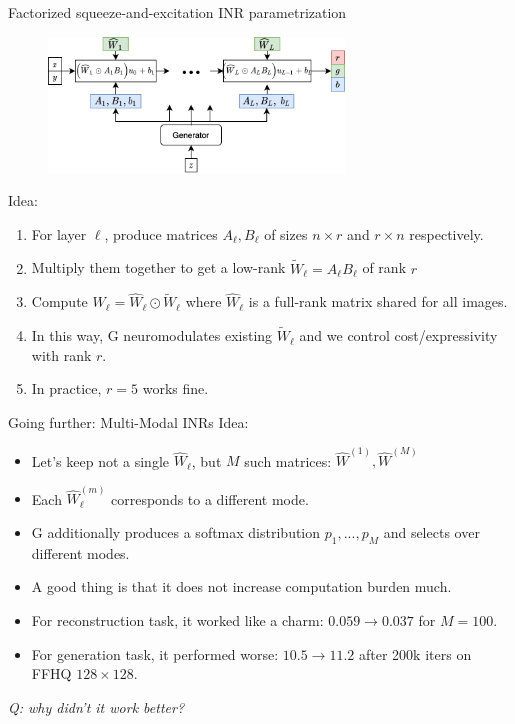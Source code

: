 \documentclass[10pt]{beamer}
\begin{document}
\begin{frame}{Factorized squeeze-and-excitation INR parametrization}
\begin{figure}
\centering
\includegraphics[width=0.7\textwidth]{images/factorized-se-linear}
\end{figure}

Idea:
\begin{enumerate}
    \item\pause For layer $\ell$, produce matrices $A_\ell, B_\ell$ of sizes $n\times r$ and $r \times n$ respectively.
    \item\pause Multiply them together to get a low-rank $\tilde{W}_\ell = A_\ell B_\ell$ of rank $r$
    \item\pause Compute $W_\ell = \hat{W}_\ell \odot \tilde{W}_\ell$ where $\hat{W}_\ell$ is a full-rank matrix shared for all images.
    \item\pause In this way, G neuromodulates existing $\tilde{W}_\ell$ and we control cost/expressivity with rank $r$.
    \item\pause In practice, $r=5$ works fine.
\end{enumerate}
\end{frame}


\begin{frame}{Going further: Multi-Modal INRs}
Idea:
\begin{itemize}
    \item\pause Let's keep not a single $\hat{W}_\ell$, but $M$ such matrices: $\hat{W}^{(1)}, \hat{W}^{(M)}$
    \item\pause Each $\hat{W}_\ell^{(m)}$ corresponds to a different mode.
    \item\pause G additionally produces a softmax distribution $p_1, ..., p_M$ and selects over different modes.
    \item\pause A good thing is that it does not increase computation burden much.
    \item\pause For reconstruction task, it worked like a charm: $0.059 \to 0.037$ for $M=100$.
    \item\pause For generation task, it performed worse: $10.5 \to 11.2$ after 200k iters on FFHQ $128 \times 128$.
\end{itemize}

\textit{Q: why didn't it work better?}
\end{frame}
\end{document}
